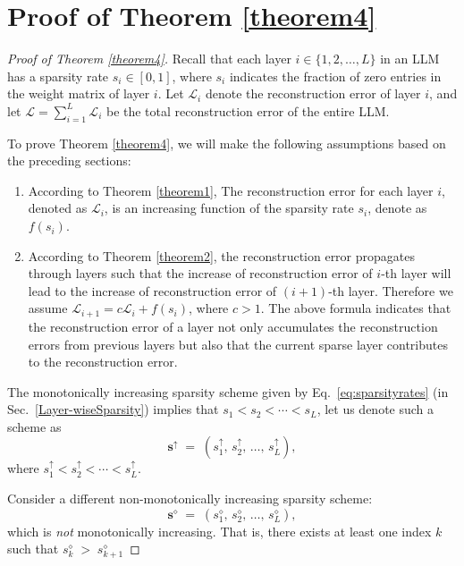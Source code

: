 \section{Proof of Theorem \ref{theorem4}}\label{sec:provetheorem4}
\begin{proof}[Proof of Theorem \ref{theorem4}]
Recall that each layer $i \in \{1, 2, \dots, L\}$ in an LLM has a sparsity rate $s_i \in [0, 1]$, where $s_i$ indicates the fraction of zero entries in the weight matrix of layer $i$. Let $\mathcal{L}_i$ denote the reconstruction error of layer $i$, and let $\mathcal{L} = \sum_{i=1}^{L} \mathcal{L}_i$ be the total reconstruction error of the entire LLM.

To prove Theorem \ref{theorem4}, we will make the following assumptions based on the preceding sections:

\begin{enumerate}
    \item According to Theorem \ref{theorem1}, The reconstruction error for each layer \( i \), denoted as \( \mathcal{L}_i \), is an increasing function of the sparsity rate \( s_i \), denote as \( f(s_i)\). 
    
    \item According to Theorem \ref{theorem2}, the reconstruction error propagates through layers such that the increase of reconstruction error of \(i\)-th layer will lead to the increase of reconstruction error of \((i+1)\)-th layer. Therefore we assume \( \mathcal{L}_{i+1} = c \mathcal{L}_i+f(s_i) \), where \( c > 1 \). The above formula indicates that the reconstruction error of a layer not only accumulates the reconstruction errors from previous layers but also that the current sparse layer contributes to the reconstruction error.
\end{enumerate}

The monotonically increasing sparsity scheme given by Eq.~\ref{eq:sparsityrates} (in Sec.~\ref{Layer-wiseSparsity}) implies that \(s_1 < s_2 < \cdots < s_L\), let us denote such a scheme as
\begin{equation}
\mathbf{s}^\uparrow \;=\; (s_1^\uparrow,\, s_2^\uparrow,\, \dots,\, s_L^\uparrow),
\end{equation}
where $s_1^\uparrow < s_2^\uparrow < \cdots < s_L^\uparrow$.

Consider a different non-monotonically increasing sparsity scheme:
\begin{equation}
  \mathbf{s}^\diamond \;=\; (s_1^\diamond,\, s_2^\diamond,\, \dots,\, s_L^\diamond),
\end{equation}
which is \textit{not} monotonically increasing. That is, there exists at least one index $k$ such that \(s_k^\diamond \;>\; s_{k+1}^\diamond\)
  

\end{proof}

